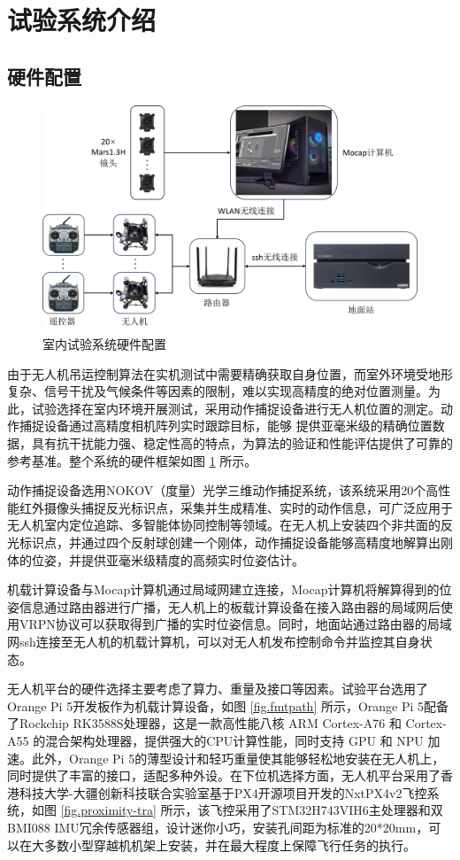 \documentclass[lang=chs, degree=master, blindreview=false, winfonts=true]{yanputhesis}
\begin{document}
\section{试验系统介绍}


\subsection{硬件配置}
\begin{figure}[hbt!]
	\centering
	\includegraphics[width=36pc]{picture/5_4.png} 
	\caption{室内试验系统硬件配置} 
	\label{framework}
\end{figure}
由于无人机吊运控制算法在实机测试中需要精确获取自身位置，而室外环境受地形复杂、信号干扰及气候条件等因素的限制，难以实现高精度的绝对位置测量。为此，试验选择在室内环境开展测试，采用动作捕捉设备进行无人机位置的测定。动作捕捉设备通过高精度相机阵列实时跟踪目标，能够
提供亚毫米级的精确位置数据，具有抗干扰能力强、稳定性高的特点，为算法的验证和性能评估提供了可靠的参考基准。整个系统的硬件框架如图 \ref{framework} 所示。


动作捕捉设备选用NOKOV（度量）光学三维动作捕捉系统，该系统采用20个高性能红外摄像头捕捉反光标识点，采集并生成精准、实时的动作信息，可广泛应用于无人机室内定位追踪、多智能体协同控制等领域。在无人机上安装四个非共面的反光标识点，并通过四个反射球创建一个刚体，动作捕捉设备能够高精度地解算出刚体的位姿，并提供亚毫米级精度的高频实时位姿估计。

机载计算设备与Mocap计算机通过局域网建立连接，Mocap计算机将解算得到的位姿信息通过路由器进行广播，无人机上的板载计算设备在接入路由器的局域网后使用VRPN协议可以获取得到广播的实时位姿信息。同时，地面站通过路由器的局域网ssh连接至无人机的机载计算机，可以对无人机发布控制命令并监控其自身状态。

无人机平台的硬件选择主要考虑了算力、重量及接口等因素。试验平台选用了Orange Pi 5开发板作为机载计算设备，如图 \ref{fig.fmtpath} 所示，Orange Pi 5配备了Rockchip RK3588S处理器，这是一款高性能八核 ARM Cortex-A76 和 Cortex-A55 的混合架构处理器，提供强大的CPU计算性能，同时支持 GPU 和 NPU 加速。此外，Orange Pi 5的薄型设计和轻巧重量使其能够轻松地安装在无人机上，同时提供了丰富的接口，适配多种外设。在下位机选择方面，无人机平台采用了香港科技大学-大疆创新科技联合实验室基于PX4开源项目开发的NxtPX4v2飞控系统，如图 \ref{fig.proximity-tra} 所示，该飞控采用了STM32H743VIH6主处理器和双BMI088 IMU冗余传感器组，设计迷你小巧，安装孔间距为标准的20*20mm，可以在大多数小型穿越机机架上安装，并在最大程度上保障飞行任务的执行。
\end{document}
